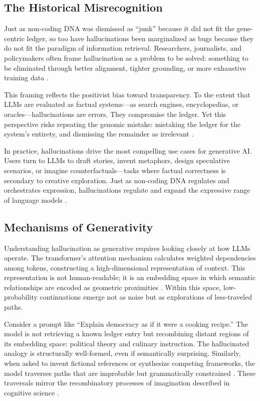 \documentclass[12pt]{article}
\begin{document}
{{{\subsection{The Historical Misrecognition}
Just as non-coding DNA was dismissed as ``junk'' because it did not fit the gene-centric ledger, so too have hallucinations been marginalized as bugs because they do not fit the paradigm of information retrieval. Researchers, journalists, and policymakers often frame hallucination as a problem to be solved: something to be eliminated through better alignment, tighter grounding, or more exhaustive training data \citep{bender2021, marcus2022}.

This framing reflects the positivist bias toward transparency. To the extent that LLMs are evaluated as factual systems---as search engines, encyclopedias, or oracles---hallucinations are errors. They compromise the ledger. Yet this perspective risks repeating the genomic mistake: mistaking the ledger for the system’s entirety, and dismissing the remainder as irrelevant \citep{keller2000}.

In practice, hallucinations drive the most compelling use cases for generative AI. Users turn to LLMs to draft stories, invent metaphors, design speculative scenarios, or imagine counterfactuals---tasks where factual correctness is secondary to creative exploration. Just as non-coding DNA regulates and orchestrates expression, hallucinations regulate and expand the expressive range of language models \citep{barad2007}.

\subsection{Mechanisms of Generativity}
Understanding hallucination as generative requires looking closely at how LLMs operate. The transformer’s attention mechanism calculates weighted dependencies among tokens, constructing a high-dimensional representation of context. This representation is not human-readable; it is an embedding space in which semantic relationships are encoded as geometric proximities \citep{vaswani2017}. Within this space, low-probability continuations emerge not as noise but as explorations of less-traveled paths.

Consider a prompt like ``Explain democracy as if it were a cooking recipe.'' The model is not retrieving a known ledger entry but recombining distant regions of its embedding space: political theory and culinary instruction. The hallucinated analogy is structurally well-formed, even if semantically surprising. Similarly, when asked to invent fictional references or synthesize competing frameworks, the model traverses paths that are improbable but grammatically constrained \citep{shanahan2023}. These traversals mirror the recombinatory processes of imagination described in cognitive science \citep{hofstadter1995}.

}}}
\end{document}
